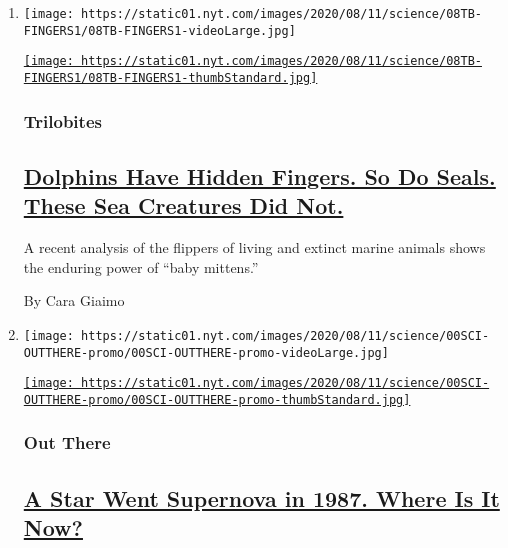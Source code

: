 \begin{enumerate}
\def\labelenumi{\arabic{enumi}.}
\item
  \texttt{[image: https://static01.nyt.com/images/2020/08/11/science/08TB-FINGERS1/08TB-FINGERS1-videoLarge.jpg]}

  \href{/2020/08/08/science/dolphins-fingers-ichthyosaurs.html}{\texttt{[image: https://static01.nyt.com/images/2020/08/11/science/08TB-FINGERS1/08TB-FINGERS1-thumbStandard.jpg]}}

  \hypertarget{trilobites}{%
  \subsubsection{Trilobites}\label{trilobites}}

  \hypertarget{dolphins-have-hidden-fingers-so-do-seals-these-sea-creatures-did-not}{%
  \subsection{\texorpdfstring{\href{/2020/08/08/science/dolphins-fingers-ichthyosaurs.html}{Dolphins
  Have Hidden Fingers. So Do Seals. These Sea Creatures Did
  Not.}}{Dolphins Have Hidden Fingers. So Do Seals. These Sea Creatures Did Not.}}\label{dolphins-have-hidden-fingers-so-do-seals-these-sea-creatures-did-not}}

  A recent analysis of the flippers of living and extinct marine animals
  shows the enduring power of ``baby mittens.''

  By Cara Giaimo
\item
  \texttt{[image: https://static01.nyt.com/images/2020/08/11/science/00SCI-OUTTHERE-promo/00SCI-OUTTHERE-promo-videoLarge.jpg]}

  \href{/2020/08/07/science/supernova-neutron-star-sn1987a.html}{\texttt{[image: https://static01.nyt.com/images/2020/08/11/science/00SCI-OUTTHERE-promo/00SCI-OUTTHERE-promo-thumbStandard.jpg]}}

  \hypertarget{out-there}{%
  \subsubsection{Out There}\label{out-there}}

  \hypertarget{a-star-went-supernova-in-1987-where-is-it-now}{%
  \subsection{\texorpdfstring{\href{/2020/08/07/science/supernova-neutron-star-sn1987a.html}{A
  Star Went Supernova in 1987. Where Is It
  Now?}}{A Star Went Supernova in 1987. Where Is It Now?}}\label{a-star-went-supernova-in-1987-where-is-it-now}}


\end{enumerate}
